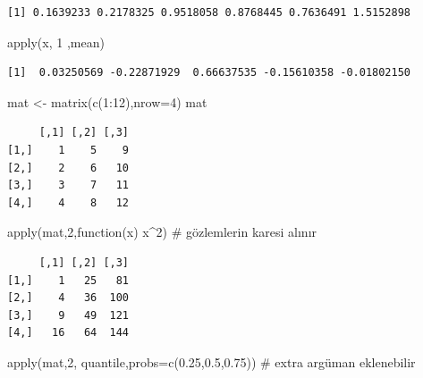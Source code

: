 \documentclass[
  letterpaper,
  DIV=11,
  numbers=noendperiod]{scrreprt}
\newenvironment{Shaded}{\begin{snugshade}}{\end{snugshade}}
\newcommand{\AttributeTok}[1]{\textcolor[rgb]{0.40,0.45,0.13}{#1}}
\newcommand{\CommentTok}[1]{\textcolor[rgb]{0.37,0.37,0.37}{#1}}
\newcommand{\ControlFlowTok}[1]{\textcolor[rgb]{0.00,0.23,0.31}{#1}}
\newcommand{\DecValTok}[1]{\textcolor[rgb]{0.68,0.00,0.00}{#1}}
\newcommand{\FloatTok}[1]{\textcolor[rgb]{0.68,0.00,0.00}{#1}}
\newcommand{\FunctionTok}[1]{\textcolor[rgb]{0.28,0.35,0.67}{#1}}
\newcommand{\NormalTok}[1]{\textcolor[rgb]{0.00,0.23,0.31}{#1}}
\newcommand{\OtherTok}[1]{\textcolor[rgb]{0.00,0.23,0.31}{#1}}
\newcommand{\SpecialCharTok}[1]{\textcolor[rgb]{0.37,0.37,0.37}{#1}}
\begin{document}
\begin{verbatim}
[1] 0.1639233 0.2178325 0.9518058 0.8768445 0.7636491 1.5152898
\end{verbatim}

\begin{Shaded}
\begin{Highlighting}[]
\FunctionTok{apply}\NormalTok{(x, }\DecValTok{1}\NormalTok{ ,mean)}
\end{Highlighting}
\end{Shaded}

\begin{verbatim}
[1]  0.03250569 -0.22871929  0.66637535 -0.15610358 -0.01802150
\end{verbatim}

\begin{Shaded}
\begin{Highlighting}[]
\NormalTok{mat }\OtherTok{\textless{}{-}} \FunctionTok{matrix}\NormalTok{(}\FunctionTok{c}\NormalTok{(}\DecValTok{1}\SpecialCharTok{:}\DecValTok{12}\NormalTok{),}\AttributeTok{nrow=}\DecValTok{4}\NormalTok{)}
\NormalTok{mat}
\end{Highlighting}
\end{Shaded}

\begin{verbatim}
     [,1] [,2] [,3]
[1,]    1    5    9
[2,]    2    6   10
[3,]    3    7   11
[4,]    4    8   12
\end{verbatim}

\begin{Shaded}
\begin{Highlighting}[]
\FunctionTok{apply}\NormalTok{(mat,}\DecValTok{2}\NormalTok{,}\ControlFlowTok{function}\NormalTok{(x) x}\SpecialCharTok{\^{}}\DecValTok{2}\NormalTok{) }\CommentTok{\# gözlemlerin karesi alınır}
\end{Highlighting}
\end{Shaded}

\begin{verbatim}
     [,1] [,2] [,3]
[1,]    1   25   81
[2,]    4   36  100
[3,]    9   49  121
[4,]   16   64  144
\end{verbatim}

\begin{Shaded}
\begin{Highlighting}[]
\FunctionTok{apply}\NormalTok{(mat,}\DecValTok{2}\NormalTok{, quantile,}\AttributeTok{probs=}\FunctionTok{c}\NormalTok{(}\FloatTok{0.25}\NormalTok{,}\FloatTok{0.5}\NormalTok{,}\FloatTok{0.75}\NormalTok{)) }\CommentTok{\# extra argüman eklenebilir}
\end{Highlighting}
\end{Shaded}
\end{document}
